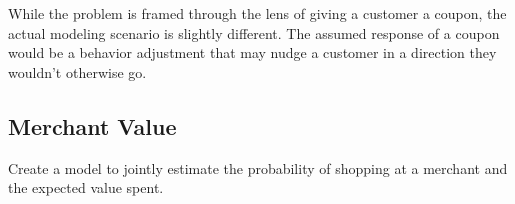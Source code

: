 \documentclass[12pt]{article} %
\begin{document}
While the problem is framed through the lens of giving a customer a coupon, the actual modeling scenario is slightly different.  The assumed response of a coupon would be a behavior adjustment that may nudge a customer in a direction they wouldn't otherwise go. 

\subsection{Merchant Value}
Create a model to jointly estimate the probability of shopping at a merchant and the expected value spent.
\end{document}
